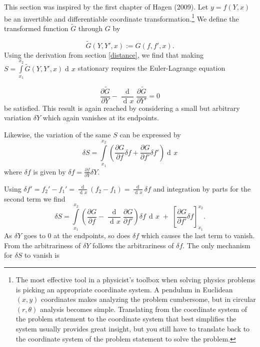 \documentclass[prb,preprint]{revtex4-1}
\DeclareMathOperator{\dd}{d\!}
\DeclareMathOperator{\ddd}{\mathrm{d}}
\begin{document}
This section was inspired by the first chapter of Hagen (2009)\cite{hagen2009path}. Let $y=f(Y,x)$ be an invertible and differentiable coordinate transformation.\footnote{The most effective tool in a physicist's toolbox when solving physics problems is picking an appropriate coordinate system. A pendulum in Euclidean $(x,y)$ coordinates makes analyzing the problem cumbersome, but in circular $(r,\theta)$ analysis becomes simple. Translating from the coordinate system of the problem statement to the coordinate system that best simplifies the system usually provides great insight, but you still have to translate back to the coordinate system of the problem statement to solve the problem.} We define the transformed function $\widetilde{G}$ through $G$ by

\begin{equation} \label{lagrangian-transform}
\widetilde{G}(Y,Y',x) := G(f,f',x).
\end{equation}
Using the derivation from section \ref{distance}, we find that making $S = \int\limits_{x_1}^{x_2} \widetilde{G}(Y,Y',x) \dd x$ stationary requires the Euler-Lagrange equation

\begin{equation}
\frac{\partial \widetilde{G}}{\partial Y}
- \frac{\ddd}{\dd x}\frac{\partial \widetilde{G}}{\partial Y'} = 0
\end{equation}
be satisfied. This result is again reached by considering a small but arbitrary variation $\delta Y$ which again vanishes at its endpoints.

Likewise, the variation of the same $S$ can be expressed by
\begin{equation}
\delta S = \int\limits_{x_1}^{x_2} \left( \frac{\partial G}{\partial f} \delta f
+ \frac{\partial G}{\partial f'} \delta f' \right) \dd x
\end{equation}
where $\delta f$ is given by $\delta f = \frac{\partial f}{\partial Y} \delta Y$.


Using $\delta f' = f_2' - f_1' = \frac{\ddd}{\dd x}(f_2 - f_1) = \frac{\dd}{\dd x} \delta f$ and integration by parts for the second term we find
\begin{equation}
\delta S = \int\limits_{x_1}^{x_2} \left( \frac{\partial G}{\partial f}
- \frac{\ddd}{\dd x} \frac{\partial G}{\partial f'} \right) \delta f \, \dd x \;
+ \; \left[\frac{\partial G}{\partial f'} \delta f \right]_{x_1}^{x_2}.
\end{equation}
As $\delta Y$ goes to $0$ at the endpoints, so does $\delta f$ which causes the last term to vanish. From the arbitrariness of $\delta Y$ follows the arbitrariness of $\delta f$. The only mechanism for $\delta S$ to vanish is
\end{document}
